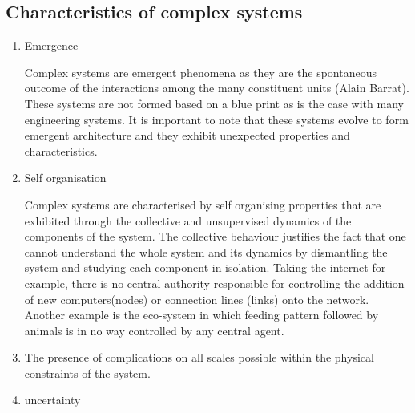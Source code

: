 \documentclass[10pt,a4paper]{article}
\begin{document}
	\subsection{Characteristics of complex systems}
	\begin{enumerate}
	\item Emergence
	
	Complex systems are emergent phenomena as they are the spontaneous outcome of the interactions among the many constituent units (Alain Barrat). These systems are not formed based on a blue print as is the case with many engineering systems. It is important to note that these systems evolve to form emergent architecture and they exhibit unexpected properties and characteristics.
	\item Self organisation
	
	Complex systems are characterised by self organising properties that are exhibited through the collective and unsupervised dynamics of the components of the system. The collective behaviour justifies the fact that one cannot understand the whole system and its dynamics by dismantling the system and studying each component in isolation. Taking the internet for example, there is no central authority responsible for controlling the addition of new computers(nodes) or connection lines (links) onto the network. Another example is the eco-system in which feeding pattern followed by animals is in no way controlled by any central agent. 
	
	\item The presence of
	complications on all scales possible within the physical constraints of the system.
	\item uncertainty
\end{enumerate}
	
\end{document}

